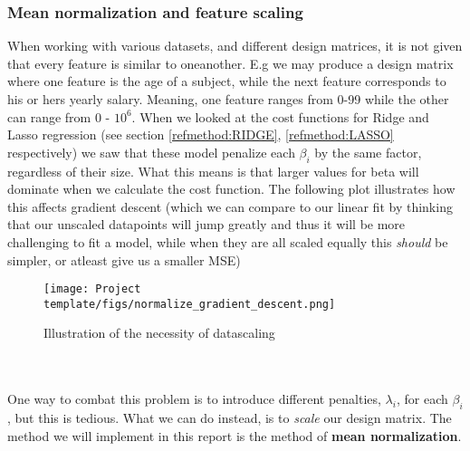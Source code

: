 \documentclass[../main.tex]{subfiles}
\begin{document}
\subsubsection{Mean normalization and feature scaling}\label{refmethod:MEAN_and_SCALING}
When working with various datasets, and different design matrices, it is not given that every feature is similar to oneanother. E.g we may produce a design matrix where one feature is the age of a subject, while the next feature corresponds to his or hers yearly salary. Meaning, one feature ranges from 0-99 while the other can range from $0$ - $10^6$. When we looked at the cost functions for Ridge and Lasso regression (see section \eqref{refmethod:RIDGE}, \eqref{refmethod:LASSO} respectively) we saw that these model penalize each $\beta_i$ by the same factor, regardless of their size. What this means is that larger values for beta will dominate when we calculate the cost function. The following plot illustrates how this affects gradient descent (which we can compare to our linear fit by thinking that our unscaled datapoints will jump greatly and thus it will be more challenging to fit a model, while when they are all scaled equally this \emph{should} be simpler, or atleast give us a smaller MSE)
\begin{figure}[h!]
    \centering
    \texttt{[image: Project template/figs/normalize\_gradient\_descent.png]}
    \caption{Illustration of the necessity of datascaling\footnotemark}
    \label{fig:Normalization_gradient}
\end{figure}
\\ \\ \indent One way to combat this problem is to introduce different penalties, $\lambda_i$, for each $\beta_i$, but this is tedious. What we can do instead, is to \emph{scale} our design matrix. The method we will implement in this report is the method of \textbf{mean normalization}.  \\ 
\end{document}
